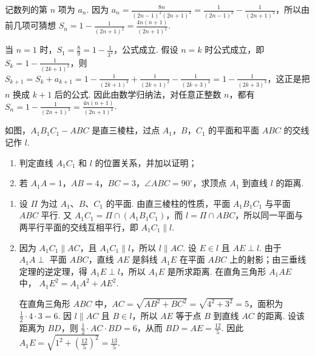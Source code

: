\begin{solution}
记数列的第 \(n\) 项为 \(a_n\). 因为
\(\displaystyle a_n=\frac{8n}{(2n-1)^2(2n+1)^2}=\frac{1}{(2n-1)^2}-\frac{1}{(2n+1)^2}\)，所以由前几项可猜想
\(\displaystyle S_n=1-\frac{1}{(2n+1)^2}=\frac{4n(n+1)}{(2n+1)^2}\).

当 \(n=1\) 时，\(\displaystyle S_1=\frac{8}{9}=1-\frac{1}{3^2}\)，公式成立. 假设 \(n=k\) 时公式成立，即 \(\displaystyle S_k=1-\frac{1}{(2k+1)^2}\)，则
\(\displaystyle S_{k+1}=S_k+a_{k+1}=1-\frac{1}{(2k+1)^2}+\frac{1}{(2k+1)^2}-\frac{1}{(2k+3)^2}=1-\frac{1}{(2k+3)^2}\)，这正是把 \(n\) 换成 \(k+1\) 后的公式. 因此由数学归纳法，对任意正整数 \(n\)，都有 \(\displaystyle S_n=1-\frac{1}{(2n+1)^2}=\frac{4n(n+1)}{(2n+1)^2}\).
\end{solution}

\begin{problem}
如图，\(A_{1}B_{1}C_{1}-ABC\) 是直三棱柱，过点 \(A_{1}\)，\(B\)，\(C_{1}\) 的平面和平面 \(ABC\) 的交线记作 \(l\).

\begin{enumerate}
\item 判定直线 \(A_{1}C_{1}\) 和 \(l\) 的位置关系，并加以证明；
\item 若 \(A_{1}A = 1\)，\(AB = 4\)，\(BC = 3\)，\(\angle ABC = 90^{\circ}\)，求顶点 \(A_{1}\) 到直线 \(l\) 的距离.
\end{enumerate}

\end{problem}

\begin{solution}
\begin{enumerate}
\item 设 \(\Pi\) 为过 \(A_1\)、\(B\)、\(C_1\) 的平面. 由直三棱柱的性质，平面 \(A_1B_1C_1\) 与平面 \(ABC\) 平行. 又 \(A_1C_1=\Pi\cap(A_1B_1C_1)\)，而 \(l=\Pi\cap ABC\)，所以同一平面与两平行平面的交线互相平行，即 \(A_1C_1\parallel l\).
\item 因为 \(A_1C_1\parallel AC\)，且 \(A_1C_1\parallel l\)，所以 \(l\parallel AC\). 设 \(E\in l\) 且 \(AE\perp l\). 由于 \(A_1A\perp\) 平面 \(ABC\)，直线 \(AE\) 是斜线 \(A_1E\) 在平面 \(ABC\) 上的射影；由三垂线定理的逆定理，得 \(A_1E\perp l\)，所以 \(A_1E\) 是所求距离. 在直角三角形 \(A_1AE\) 中，
\(A_1E^2=A_1A^2+AE^2\).

在直角三角形 \(ABC\) 中，\(AC=\sqrt{AB^2+BC^2}=\sqrt{4^2+3^2}=5\)，面积为 \(\frac{1}{2}\cdot4\cdot3=6\). 因 \(l\parallel AC\) 且 \(B\in l\)，所以 \(AE\) 等于点 \(B\) 到直线 \(AC\) 的距离. 设该距离为 \(BD\)，则 \(\frac{1}{2}\cdot AC\cdot BD=6\)，从而 \(BD=AE=\frac{12}{5}\). 因此
\(\displaystyle A_1E=\sqrt{1^2+\left(\frac{12}{5}\right)^2}=\frac{13}{5}\).
\end{enumerate}
\end{solution}

